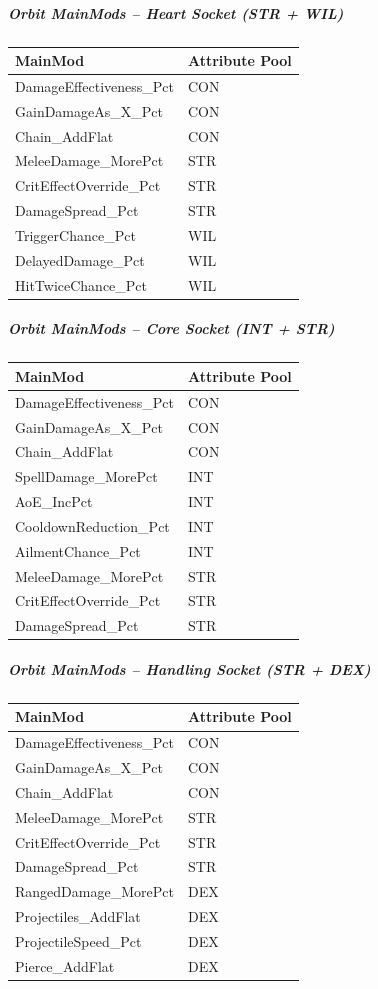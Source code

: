 \subparagraph{Orbit MainMods -- Heart Socket (STR + WIL)}
\begin{tabular}{l|l}
	\textbf{MainMod} & \textbf{Attribute Pool} \\ \hline
	DamageEffectiveness\_Pct & CON \\
	GainDamageAs\_X\_Pct & CON \\
	Chain\_AddFlat & CON \\
	MeleeDamage\_MorePct & STR \\
	CritEffectOverride\_Pct & STR \\
	DamageSpread\_Pct & STR \\
	TriggerChance\_Pct & WIL \\
	DelayedDamage\_Pct & WIL \\
	HitTwiceChance\_Pct & WIL \\
\end{tabular}

\subparagraph{Orbit MainMods -- Core Socket (INT + STR)}
\begin{tabular}{l|l}
	\textbf{MainMod} & \textbf{Attribute Pool} \\ \hline
	DamageEffectiveness\_Pct & CON \\
	GainDamageAs\_X\_Pct & CON \\
	Chain\_AddFlat & CON \\
	SpellDamage\_MorePct & INT \\
	AoE\_IncPct & INT \\
	CooldownReduction\_Pct & INT \\
	AilmentChance\_Pct & INT \\
	MeleeDamage\_MorePct & STR \\
	CritEffectOverride\_Pct & STR \\
	DamageSpread\_Pct & STR \\
\end{tabular}

\subparagraph{Orbit MainMods -- Handling Socket (STR + DEX)}
\begin{tabular}{l|l}
	\textbf{MainMod} & \textbf{Attribute Pool} \\ \hline
	DamageEffectiveness\_Pct & CON \\
	GainDamageAs\_X\_Pct & CON \\
	Chain\_AddFlat & CON \\
	MeleeDamage\_MorePct & STR \\
	CritEffectOverride\_Pct & STR \\
	DamageSpread\_Pct & STR \\
	RangedDamage\_MorePct & DEX \\
	Projectiles\_AddFlat & DEX \\
	ProjectileSpeed\_Pct & DEX \\
	Pierce\_AddFlat & DEX \\
\end{tabular}

